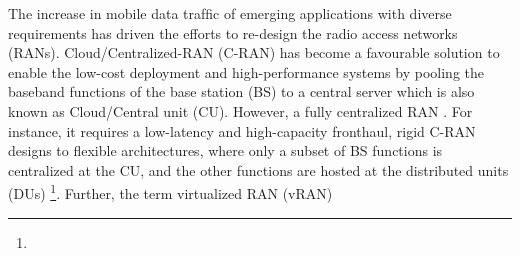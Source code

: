 The increase in mobile data trafﬁc of emerging applications with diverse requirements has driven the efforts to re-design the radio access networks (RANs). Cloud/Centralized-RAN (C-RAN) has become a favourable solution to enable the low-cost deployment and high-performance systems by pooling the baseband functions of the base station (BS) to a central server which is also known as Cloud/Central unit (CU).  However, a fully centralized RAN . For instance, it requires a low-latency and high-capacity fronthaul,  rigid C-RAN designs to flexible architectures, where only a subset of BS functions is centralized at the CU, and the other functions are hosted at the distributed units (DUs) \footnote{}. Further, the term virtualized RAN (vRAN) 
%
%
%
